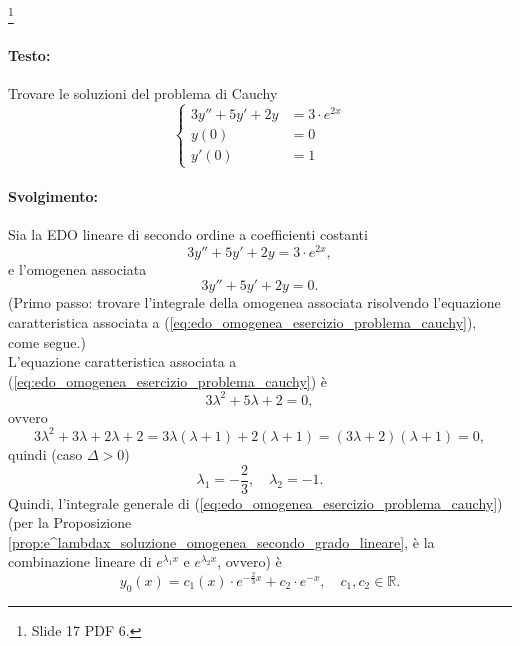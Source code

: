 \begin{example}\footnote{Slide 17 PDF 6.}
	\paragraph{Testo:} Trovare le soluzioni del problema di Cauchy
	\begin{equation*}
		\begin{cases}
			3 y'' + 5 y' + 2 y &= 3\cdot e^{2x}\\
			y(0) &= 0\\
			y'(0) &= 1
		\end{cases}
	\end{equation*}
	\paragraph{Svolgimento:} Sia la EDO lineare di secondo ordine a coefficienti costanti
	\begin{equation}\label{eq:edo_completa_esercizio_problema_cauchy}
		3 y'' + 5 y' + 2 y = 3\cdot e^{2x},
	\end{equation}
	e l'omogenea associata
	\begin{equation}\label{eq:edo_omogenea_esercizio_problema_cauchy}
		3 y'' + 5 y' + 2 y = 0.
	\end{equation}
	(Primo passo: trovare l'integrale della omogenea associata risolvendo l'equazione caratteristica associata a (\ref{eq:edo_omogenea_esercizio_problema_cauchy}), come segue.)\\
	L'equazione caratteristica associata a (\ref{eq:edo_omogenea_esercizio_problema_cauchy}) è
	\begin{equation*}
		3\lambda^2 + 5 \lambda + 2 = 0,
	\end{equation*}
	ovvero
	\begin{equation*}
		3\lambda ^2 + 3\lambda + 2\lambda + 2 = 3\lambda(\lambda +1) + 2(\lambda + 1)=(3 \lambda +2)(\lambda +1)=0,
	\end{equation*}
	quindi (caso $\Delta>0$)
	\begin{equation*}
		\lambda_1 = -\frac{2}{3},\quad \lambda_2 = -1.
	\end{equation*}
	Quindi, l'integrale generale di (\ref{eq:edo_omogenea_esercizio_problema_cauchy}) (per la Proposizione \ref{prop:e^lambdax_soluzione_omogenea_secondo_grado_lineare}, è la combinazione lineare di $e^{\lambda_1 x}$ e $e^{\lambda_2 x}$, ovvero) è
	\begin{equation*}
		y_0(x)=c_1(x)\cdot e^{-\frac{2}{3}x} + c_2 \cdot e^{-x},\quad c_1,c_2\in\mathbb{R}.

\end{equation*}
\end{example}
